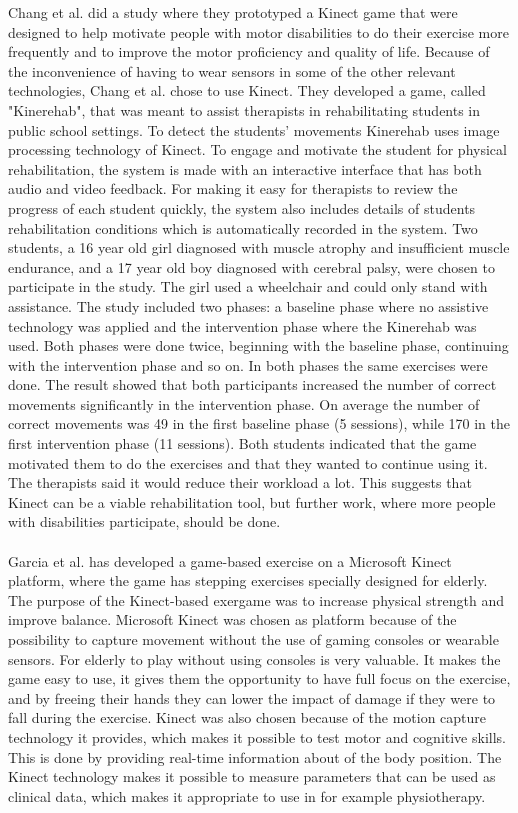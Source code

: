 Chang et al. did a study where they prototyped a Kinect game that were designed to help motivate people with motor disabilities to do their exercise more frequently and to improve the motor proficiency and quality of life. Because of the inconvenience of having to wear sensors in some of the other relevant technologies, Chang et al. chose to use Kinect. They developed a game, called "Kinerehab", that was meant to assist therapists in rehabilitating students in public school settings. To detect the students’ movements Kinerehab uses image processing technology of Kinect. To engage and motivate the student for physical rehabilitation, the system is made with an interactive interface that has both audio and video feedback. For making it easy for therapists to review the progress of each student quickly, the system also includes details of students rehabilitation conditions which is automatically recorded in the system. Two students, a 16 year old girl diagnosed with  muscle atrophy and insufficient muscle endurance, and a 17 year old boy diagnosed with cerebral palsy, were chosen to participate in the study. The girl used a wheelchair and could only stand with assistance. The study included two phases: a baseline phase  where no assistive technology was applied and the intervention phase where the Kinerehab was used. Both phases were done twice, beginning with the baseline phase, continuing with the intervention phase and so on. In both phases the same exercises were done. The result showed that both participants increased the number of correct movements significantly in the intervention phase. On average the number of correct movements was 49 in the first baseline phase (5 sessions), while 170 in the first intervention phase (11 sessions). Both students indicated that the game motivated them to do the exercises and that they wanted to continue using it. The therapists said it would reduce their workload a lot. This suggests that Kinect can be a viable rehabilitation tool, but further work, where more people with disabilities participate, should be done. \cite{kinect} \\ \\ 
Garcia et al. \cite{garcia2012exergames} has developed a game-based exercise on a Microsoft Kinect platform, where the game has stepping exercises specially designed for elderly. The purpose of the Kinect-based exergame was to increase physical strength and improve balance. Microsoft Kinect was chosen as platform because of the possibility to capture movement without the use of gaming consoles or wearable sensors. For elderly to play without using consoles is very valuable. It makes the game easy to use, it gives them the opportunity to have full focus on the exercise, and by freeing their hands they can lower the impact of damage if they were to fall during the exercise. Kinect was also chosen because of the motion capture technology it provides, which makes it possible to test motor and cognitive skills. This is done by providing real-time information about of the body position. The Kinect technology makes it possible to measure parameters that can be used as clinical data, which makes it appropriate to use in for example physiotherapy.

